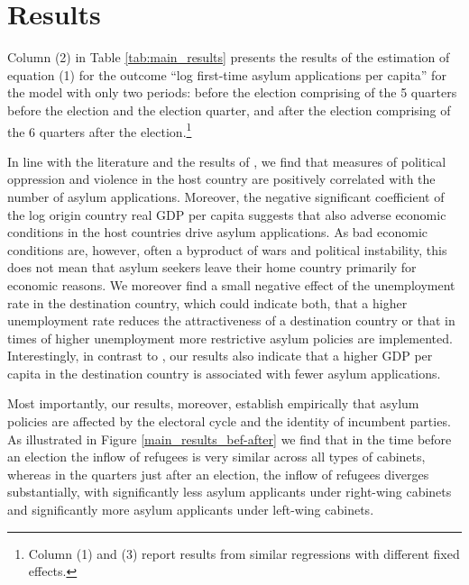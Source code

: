 \documentclass[a4paper,12pt]{article}
\begin{document}
\section{Results} \label{sec:results}
  Column (2) in Table \ref{tab:main_results} presents the results of the estimation of equation (1) for the outcome ``log first-time asylum applications per capita'' for the model with only two periods: before the election comprising of the 5 quarters before the election and the election quarter, and after the election comprising of the 6 quarters after the election.\footnote{Column (1) and (3) report results from similar regressions with different fixed effects.}  
  
 In line with the literature and the results of \citet{hatton2016}, we find that measures of political oppression and violence in the host country are positively correlated with the number of asylum applications. Moreover, the negative significant coefficient of the log origin country real GDP per capita suggests that also adverse economic conditions in the host countries drive asylum applications. As bad economic conditions are, however, often a byproduct of wars and political instability, this does not mean that asylum seekers leave their home country primarily for economic reasons. We moreover find a small negative effect of the unemployment rate in the destination country, which could indicate both, that a higher unemployment rate reduces the attractiveness of a destination country or that in times of higher unemployment more restrictive asylum policies are implemented. Interestingly, in contrast to \citet{hatton2016}, our results also indicate that a higher GDP per capita in the destination country is associated with fewer asylum applications. 


 
 Most importantly, our results, moreover, establish empirically that asylum policies are affected by the electoral cycle and the identity of incumbent parties. As illustrated in Figure \ref{main_results_bef-after} we find that in the time before an election the inflow of refugees is very similar across all types of cabinets, whereas in the quarters just after an election, the inflow of refugees diverges substantially, with significantly less asylum applicants under right-wing cabinets and significantly more asylum applicants under left-wing cabinets. 
 
\end{document}
